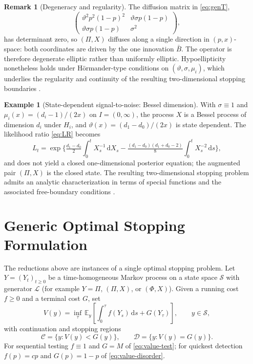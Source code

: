 \documentclass[pdflatex,sn-mathphys-num]{sn-jnl}
\theoremstyle{plain}
\theoremstyle{definition}
\newtheorem{remark}[theorem]{Remark}
\newtheorem{example}[theorem]{Example}
\newcommand{\E}{\mathbb{E}}
\newcommand{\Lgen}{\mathscr{L}}
\newcommand{\dd}{\,\mathrm{d}}
\newcommand{\snr}{\vartheta}
\newcommand{\post}{\Pi}
\newcommand{\odds}{\Phi}
\newcommand{\bbar}{\bar{B}}
\begin{document}
\begin{remark}[Degeneracy and regularity]\label{rem:degenerate}
The diffusion matrix in \eqref{eq:genT},
\[
  \begin{pmatrix}\snr^2 p^2(1-p)^2 & \snr\sigma p(1-p)\\[2pt]
  \snr\sigma p(1-p) & \sigma^2\end{pmatrix},
\]
has determinant zero, so
$(\post,X)$ diffuses along a single direction in $(p,x)$-space: both coordinates
are driven by the one innovation $\bbar$. The operator is therefore degenerate
elliptic rather than uniformly elliptic. Hypoellipticity nonetheless holds under
H\"ormander-type conditions on $(\snr,\sigma,\mu_i)$, which underlies the
regularity and continuity of the resulting two-dimensional stopping boundaries
\citep{peskir2019continuity,ernst2024gapeev}.
\end{remark}

\begin{example}[State-dependent signal-to-noise: Bessel dimension]\label{ex:bessel}
With $\sigma\equiv1$ and $\mu_i(x)=(d_i-1)/(2x)$ on $I=(0,\infty)$, the process
$X$ is a Bessel process of dimension $d_i$ under $H_i$, and
$\snr(x)=(d_1-d_0)/(2x)$ is state dependent. The likelihood ratio \eqref{eq:LR}
becomes
\[
  L_t=\exp\!\Big\{\tfrac{d_1-d_0}{2}\int_0^t X_s^{-1}\dd X_s
   -\tfrac{(d_1-d_0)(d_1+d_0-2)}{8}\int_0^t X_s^{-2}\dd s\Big\},
\]
and does not yield a closed one-dimensional posterior equation; the augmented pair
$(\post,X)$ is the closed state. The resulting two-dimensional stopping problem
admits an analytic characterization in terms of special functions and the
associated free-boundary conditions \citep{johnson2017quickest,johnson2018sequential}.
\end{example}

\section{Generic Optimal Stopping Formulation}\label{sec:os}

The reductions above are instances of a single optimal stopping problem. Let
$Y=(Y_t)_{t\ge0}$ be a time-homogeneous Markov process on a state space
$\mathcal S$ with generator $\Lgen$ (for example $Y=\post$, $(\post,X)$, or
$(\odds,X)$). Given a running cost $f\ge0$ and a terminal cost $G$, set
\begin{equation}\label{eq:generic-os}
  V(y)=\inf_\tau\,\E_y\!\left[\int_0^\tau f(Y_s)\dd s+G(Y_\tau)\right],\qquad
  y\in\mathcal S,
\end{equation}
with continuation and stopping regions
\begin{equation}\label{eq:CD}
  \mathcal C=\{y:V(y)<G(y)\},\qquad \mathcal D=\{y:V(y)=G(y)\}.
\end{equation}
For sequential testing $f\equiv1$ and $G=M$ of \eqref{eq:value-test}; for
quickest detection $f(p)=cp$ and $G(p)=1-p$ of \eqref{eq:value-disorder}.
\end{document}
